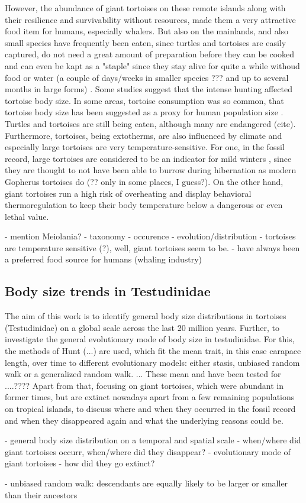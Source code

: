 However, the abundance of giant tortoises on these remote islands along with their resilience and survivability without resources, made them a very attractive food item for humans, especially whalers.
But also on the mainlands, and also small species have frequently been eaten, since turtles and tortoises are easily captured, do not need a great amount of preparation before they can be cooked and can even be kapt as a "staple" since they stay alive for quite a while withoud food or water (a couple of days/weeks in smaller species ??? and up to several months in large forms) \citep{Thompson2002,Thompson2014}. Some studies suggest that the intense hunting affected tortoise body size. In some areas, tortoise consumption was so common, that tortoise body size has been suggested as a proxy for human population size \citep{Steele2005,Stiner1999,Stiner2000}. Turtles and tortoises are still being eaten, although many are endangered (cite).
Furthermore, tortoises, being extotherms, are also influenced by climate and especially large tortoises are very temperature-sensitive. For one, in the fossil record, large tortoises are considered to be an indicator for mild winters \citep{Hibbard1960}, since they are thought to not have been able to burrow during hibernation as modern Gopherus tortoises do (?? only in some places, I guess?). On the other hand, giant tortoises run a high risk of overheating and display behavioral thermoregulation to keep their body temperature below a dangerous or even lethal value. \citep{Sturbaum1982, Schleich1981} 


 
- mention Meiolania?
- taxonomy
- occurence
- evolution/distribution
- tortoises are temperature sensitive (?), well, giant tortoises seem to be.
- have always been a preferred food source for humans (whaling industry)

\subsection{Body size trends in Testudinidae}

The aim of this work is to identify general body size distributions in tortoises (Testudinidae) on a global scale across the last 20 million years. Further, to investigate the general evolutionary mode of body size in testudinidae. 
For this, the methods of Hunt (...) are used, which fit the mean trait, in this case carapace length, over time to different evolutionary models: either stasis, unbiased random walk or a generalized random walk.
... These mean and have been tested for ....????
Apart from that, focusing on giant tortoises, which were abundant in former times, but are extinct nowadays apart from a few remaining populations on tropical islands, to discuss where and when they occurred in the fossil record and when they disappeared again and what the underlying reasons could be.

- general body size distribution on a temporal and spatial scale
- when/where did giant tortoises occurr, when/where did they disappear?
- evolutionary mode of giant tortoises
- how did they go extinct?


- unbiased random walk: descendants are equally likely to be larger or smaller than their ancestors



